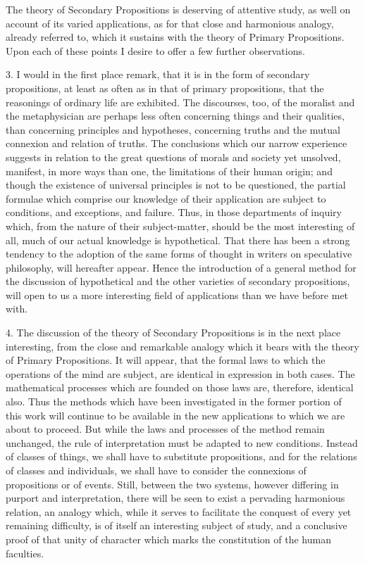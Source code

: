 \documentclass[oneside]{book}
\begin{document}
The theory of Secondary Propositions is deserving of attentive
study, as well on account of its varied applications, as
for that close and harmonious analogy, already referred to, which
it sustains with the theory of Primary Propositions. Upon each
of these points I desire to offer a few further observations.

3. I would in the first place remark, that it is in the form of
secondary propositions, at least as often as in that of primary propositions,
that the reasonings of ordinary life are exhibited. The
discourses, too, of the moralist and the metaphysician are perhaps
less often concerning things and their qualities, than concerning
principles and hypotheses, concerning truths and the mutual connexion
and relation of truths. The conclusions which our narrow
experience suggests in relation to the great questions of morals and
society yet unsolved, manifest, in more ways than one, the limitations
of their human origin; and though the existence of universal
principles is not to be questioned, the partial formulae
which comprise our knowledge of their application are subject
to conditions, and exceptions, and failure. Thus, in those departments
of inquiry which, from the nature of their subject-matter,
should be the most interesting of all, much of our actual
knowledge is hypothetical. That there has been a strong tendency
to the adoption of the same forms of thought in writers
on speculative philosophy, will hereafter appear. Hence the introduction
of a general method for the discussion of hypothetical
and the other varieties of secondary propositions, will open to us
a more interesting field of applications than we have before met
with.

4. The discussion of the theory of Secondary Propositions is
in the next place interesting, from the close and remarkable analogy
which it bears with the theory of Primary Propositions. It
will appear, that the formal laws to which the operations of the mind
are subject, are identical in expression in both cases. The mathematical
processes which are founded on those laws are, therefore,
identical also. Thus the methods which have been investigated
in the former portion of this work will continue to be available
in the new applications to which we are about to proceed. But
while the laws and processes of the method remain unchanged,
the rule of interpretation must be adapted to new conditions.
Instead of classes of things, we shall have to substitute propositions,
and for the relations of classes and individuals, we shall
have to consider the connexions of propositions or of events.
Still, between the two systems, however differing in purport and
interpretation, there will be seen to exist a pervading harmonious
relation, an analogy which, while it serves to facilitate the conquest
of every yet remaining difficulty, is of itself an interesting
subject of study, and a conclusive proof of that unity of character
which marks the constitution of the human faculties.
\end{document}
